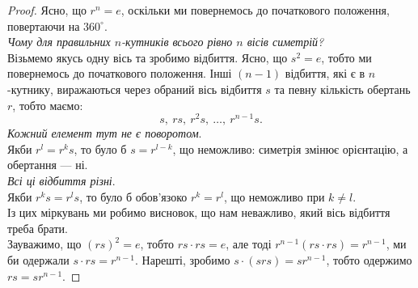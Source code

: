\documentclass{math_library}
\begin{document}
\begin{figure}[H]
\centering
{}
\qquad
{}
\end{figure}


\begin{proof}
Ясно, що $r^n = e$, оскільки ми повернемось до початкового положення, повертаючи на $360^\circ$.
\bigskip \\
\textit{Чому для правильних $n$-кутників всього рівно $n$ вісів симетрій?}\\
Візьмемо якусь одну вісь та зробимо відбиття. Ясно, що $s^2 = e$, тобто ми повернемось до початкового положення. Інші $(n-1)$ відбиття, які є в $n$-кутнику, виражаються через обраний вісь відбиття $s$ та певну кількість обертань $r$, тобто маємо:
\[
s,\ rs,\ r^2s,\ \dots,\ r^{n-1}s.
\]
\textit{Кожний елемент тут не є поворотом}.\\
Якби $r^l = r^ks$, то було б $s = r^{l-k}$, що неможливо: симетрія змінює орієнтацію, а обертання --- ні.
\bigskip \\
\textit{Всі ці відбиття різні}.\\
Якби $r^k s = r^l s$, то було б обов'язоко $r^k = r^l$, що неможливо при $k \neq l$.
\bigskip \\
Із цих міркувань ми робимо висновок, що нам неважливо, який вісь відбиття треба брати.
\bigskip \\
Зауважимо, що $(rs)^2 = e$, тобто $rs \cdot rs = e$, але тоді $r^{n-1} (rs \cdot rs) = r^{n-1}$, ми би одержали $s \cdot rs = r^{n-1}$. Нарешті, зробимо $s \cdot (srs) = sr^{n-1}$, тобто одержимо $rs = sr^{n-1}$.
\end{proof}
\end{document}
